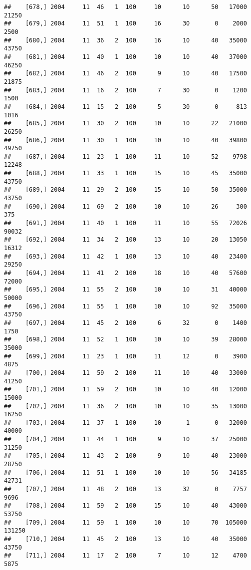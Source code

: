 \documentclass{article}\usepackage[]{graphicx}\usepackage[]{color}
\makeatletter
\newenvironment{kframe}{%
 \def\at@end@of@kframe{}%
 \ifinner\ifhmode%
  \def\at@end@of@kframe{\end{minipage}}%
  \begin{minipage}{\columnwidth}%
 \fi\fi%
 \def\FrameCommand##1{\hskip\@totalleftmargin \hskip-\fboxsep
 \colorbox{shadecolor}{##1}\hskip-\fboxsep
     \hskip-\linewidth \hskip-\@totalleftmargin \hskip\columnwidth}%
 \MakeFramed {\advance\hsize-\width
   \@totalleftmargin\z@ \linewidth\hsize
   \@setminipage}}%
 {\par\unskip\endMakeFramed%
 \at@end@of@kframe}
\newenvironment{knitrout}{}{} %
\makeatother
\begin{document}
\begin{knitrout}
\begin{kframe}
\begin{verbatim}
##    [678,] 2004     11  46   1  100     10      10      50   17000   21250
##    [679,] 2004     11  51   1  100     16      30       0    2000    2500
##    [680,] 2004     11  36   2  100     16      10      40   35000   43750
##    [681,] 2004     11  40   1  100     10      10      40   37000   46250
##    [682,] 2004     11  46   2  100      9      10      40   17500   21875
##    [683,] 2004     11  16   2  100      7      30       0    1200    1500
##    [684,] 2004     11  15   2  100      5      30       0     813    1016
##    [685,] 2004     11  30   2  100     10      10      22   21000   26250
##    [686,] 2004     11  30   1  100     10      10      40   39800   49750
##    [687,] 2004     11  23   1  100     11      10      52    9798   12248
##    [688,] 2004     11  33   1  100     15      10      45   35000   43750
##    [689,] 2004     11  29   2  100     15      10      50   35000   43750
##    [690,] 2004     11  69   2  100     10      10      26     300     375
##    [691,] 2004     11  40   1  100     11      10      55   72026   90032
##    [692,] 2004     11  34   2  100     13      10      20   13050   16312
##    [693,] 2004     11  42   1  100     13      10      40   23400   29250
##    [694,] 2004     11  41   2  100     18      10      40   57600   72000
##    [695,] 2004     11  55   2  100     10      10      31   40000   50000
##    [696,] 2004     11  55   1  100     10      10      92   35000   43750
##    [697,] 2004     11  45   2  100      6      32       0    1400    1750
##    [698,] 2004     11  52   1  100     10      10      39   28000   35000
##    [699,] 2004     11  23   1  100     11      12       0    3900    4875
##    [700,] 2004     11  59   2  100     11      10      40   33000   41250
##    [701,] 2004     11  59   2  100     10      10      40   12000   15000
##    [702,] 2004     11  36   2  100     10      10      35   13000   16250
##    [703,] 2004     11  37   1  100     10       1       0   32000   40000
##    [704,] 2004     11  44   1  100      9      10      37   25000   31250
##    [705,] 2004     11  43   2  100      9      10      40   23000   28750
##    [706,] 2004     11  51   1  100     10      10      56   34185   42731
##    [707,] 2004     11  48   2  100     13      32       0    7757    9696
##    [708,] 2004     11  59   2  100     15      10      40   43000   53750
##    [709,] 2004     11  59   1  100     10      10      70  105000  131250
##    [710,] 2004     11  45   2  100     13      10      40   35000   43750
##    [711,] 2004     11  17   2  100      7      10      12    4700    5875

\end{verbatim}
\end{kframe}
\end{knitrout}
\end{document}
